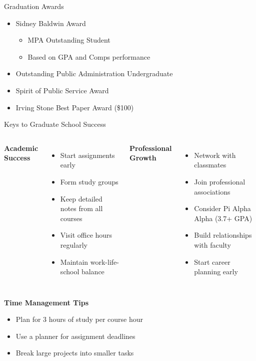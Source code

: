 \documentclass[10pt]{beamer}
\begin{document}
\begin{frame}{Graduation Awards}
\begin{itemize}
\item Sidney Baldwin Award
    \begin{itemize}
    \item MPA Outstanding Student
    \item Based on GPA and Comps performance
    \end{itemize}
\item Outstanding Public Administration Undergraduate
\item Spirit of Public Service Award
\item Irving Stone Best Paper Award (\$100)
\end{itemize}
\end{frame}


\begin{frame}{Keys to Graduate School Success}
    \begin{columns}[t]
    \textbf{Academic Success}
    \begin{itemize}
    \item Start assignments early
    \item Form study groups
    \item Keep detailed notes from all courses
    \item Visit office hours regularly
    \item Maintain work-life-school balance
    \end{itemize}
    
    \textbf{Professional Growth}
    \begin{itemize}
    \item Network with classmates
    \item Join professional associations
    \item Consider Pi Alpha Alpha (3.7+ GPA)
    \item Build relationships with faculty
    \item Start career planning early
    \end{itemize}
    \end{columns}
    
    \vspace{0.5em}
    \textbf{Time Management Tips}
    \begin{itemize}
    \item Plan for 3 hours of study per course hour
    \item Use a planner for assignment deadlines
    \item Break large projects into smaller tasks
    \end{itemize}
    \end{frame}
    
\end{document}

